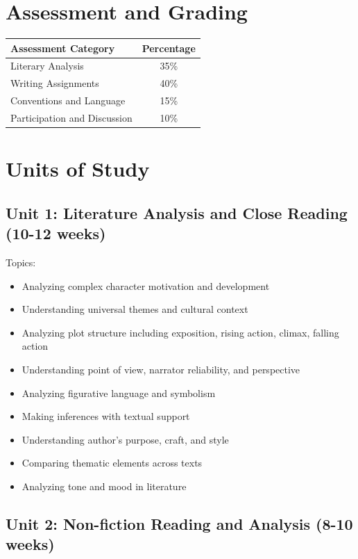\documentclass[11pt,letterpaper]{report}
\begin{document}
\section{Assessment and Grading}

\begin{center}
\begin{tabular}{|l|c|}
\hline
\textbf{Assessment Category} & \textbf{Percentage} \\
\hline
Literary Analysis & 35\% \\
\hline
Writing Assignments & 40\% \\
\hline
Conventions and Language & 15\% \\
\hline
Participation and Discussion & 10\% \\
\hline
\end{tabular}
\end{center}

\section{Units of Study}

\subsection{Unit 1: Literature Analysis and Close Reading (10-12 weeks)}

Topics:
\begin{itemize}
\item Analyzing complex character motivation and development
\item Understanding universal themes and cultural context
\item Analyzing plot structure including exposition, rising action, climax, falling action
\item Understanding point of view, narrator reliability, and perspective
\item Analyzing figurative language and symbolism
\item Making inferences with textual support
\item Understanding author's purpose, craft, and style
\item Comparing thematic elements across texts
\item Analyzing tone and mood in literature
\end{itemize}

\subsection{Unit 2: Non-fiction Reading and Analysis (8-10 weeks)}
\end{document}
